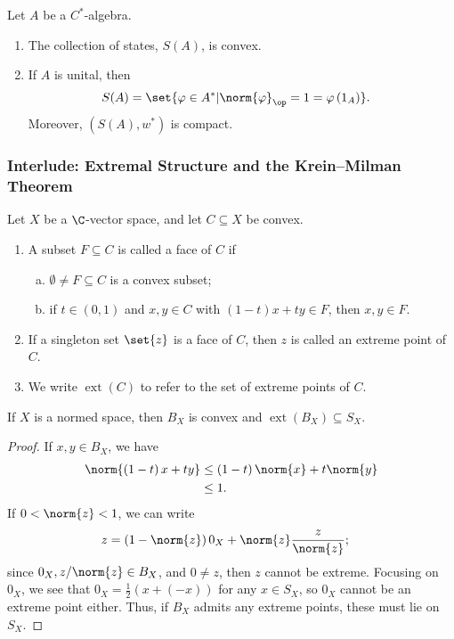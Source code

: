 \documentclass[10pt]{mypackage}
\begin{document}
\begin{corollary}
  Let $A$ be a $C^{\ast}$-algebra.
  \begin{enumerate}[(1)]
    \item The collection of states, $S(A)$, is convex.
    \item If $A$ is unital, then
      \begin{align*}
        S(A) &= \set{\varphi\in A^{\ast} | \norm{\varphi}_{\op} = 1 = \varphi\left(1_A\right)}.
      \end{align*}
      Moreover, $\left(S\left(A\right),w^{\ast}\right)$ is compact.
  \end{enumerate}
\end{corollary}
\subsubsection{Interlude: Extremal Structure and the Krein--Milman Theorem}%
\begin{definition}[]
  Let $X$ be a $\C$-vector space, and let $C\subseteq X$ be convex.
  \begin{enumerate}[(1)]
    \item A subset $F\subseteq C$ is called a face of $C$ if
      \begin{enumerate}[(a)]
        \item $\emptyset\neq F\subseteq C$ is a convex subset;
        \item if $t\in (0,1)$ and $x,y\in C$ with $\left(1-t\right)x + ty \in F$, then $x,y\in F$.
      \end{enumerate}
    \item If a singleton set $\set{z}$ is a face of $C$, then $z$ is called an extreme point of $C$.
    \item We write $\operatorname{ext}\left(C\right)$ to refer to the set of extreme points of $C$.
  \end{enumerate}
\end{definition}
\begin{fact}
  If $X$ is a normed space, then $B_{X}$ is convex and $\operatorname{ext}\left(B_X\right) \subseteq S_{X}$.
\end{fact}
\begin{proof}
  If $x,y\in B_{X}$, we have
  \begin{align*}
    \norm{\left(1-t\right)x + ty} &\leq \left(1-t\right)\norm{x} + t\norm{y}\\
                                  &\leq 1.
  \end{align*}
  If $0 < \norm{z} < 1$, we can write
  \begin{align*}
    z &= \left(1-\norm{z}\right)0_X + \norm{z}\frac{z}{\norm{z}};
  \end{align*}
  since $0_X,z/\norm{z}\in B_X$, and $0\neq z$, then $z$ cannot be extreme. Focusing on $0_X$, we see that $0_X = \frac{1}{2}\left(x + (-x)\right)$ for any $x\in S_X$, so $0_X$ cannot be an extreme point either. Thus, if $B_X$ admits any extreme points, these must lie on $S_X$.
\end{proof}
\end{document}

